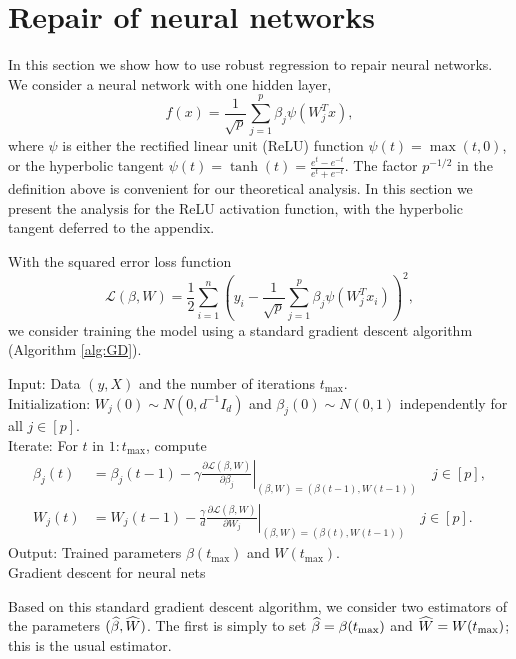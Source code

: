 

\def\L{{\mathcal L}}
\section{Repair of neural networks}
\label{sec:neural}

In this section we show how to use robust regression to repair neural networks.
We consider a neural network with one hidden layer,
$$f(x)=\frac{1}{\sqrt{p}}\sum_{j=1}^p\beta_j\psi(W_j^Tx),$$
where $\psi$ is either the rectified linear unit (ReLU) function $\psi(t)=\max(t,0)$, or the
hyperbolic tangent $\psi(t) = \tanh(t) = \frac{e^t - e^{-t}}{e^t + e^{-t}}$.
The factor $p^{-1/2}$ in the definition above is convenient for our theoretical analysis.
In this section we present the analysis for the ReLU activation function, with the hyperbolic tangent
deferred to the appendix.

With the squared error loss function
$$\L(\beta,W)=\frac{1}{2}\sum_{i=1}^n\left(y_i - \frac{1}{\sqrt{p}}\sum_{j=1}^p\beta_j\psi(W_j^Tx_i)\right)^2,$$
we consider training the model using a standard gradient descent algorithm (Algorithm \ref{alg:GD}).

\vskip10pt
\begin{algorithm}[H]
\DontPrintSemicolon
\vskip5pt
\nl Input: Data $(y, X)$ and the number of iterations $t_{\max}$. \\[3pt]
\nl Initialization: $W_j(0)\sim N(0,d^{-1}I_d)$ and $\beta_j(0)\sim N(0,1)$ independently for all $j\in[p]$. \\[3pt]
\nl Iterate: For $t$ in $1:t_{\max}$, compute
\begin{align*}
\beta_j(t) &= \beta_j(t-1) - \left.\gamma\frac{\partial \L(\beta,W)}{\partial \beta_j}\right|_{(\beta,W)=(\beta(t-1),W(t-1))} \quad j\in[p], \\
W_j(t) &= W_j(t-1) - \left.\frac{\gamma}{d}\frac{\partial \L(\beta,W)}{\partial W_j}\right|_{(\beta,W)=(\beta(t),W(t-1))} \quad j\in[p].
\end{align*}
\nl Output: Trained parameters $\beta(t_{\max})$ and $W(t_{\max})$.\\[5pt]
\caption{Gradient descent for neural nets}\label{alg:GD}
\end{algorithm}
\vskip10pt

Based on this standard gradient descent algorithm, we consider two estimators of the parameters $(\widehat{\beta},\widehat{W})$.
The first is simply to set $\widehat{\beta}=\beta(t_{\max})$ and $\widehat{W}=W(t_{\max})$; this is the usual estimator.

